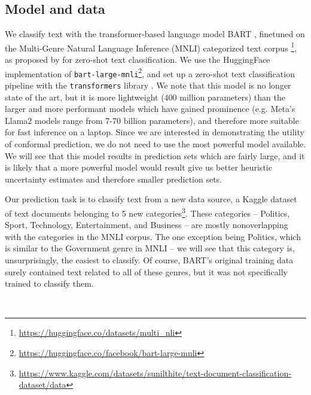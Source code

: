 \documentclass[a4paper, 12pt]{article}
\begin{document}
\subsection*{Model and data}
We classify text with the transformer-based language model BART \autocite{lewisBARTDenoisingSequencetoSequence2019},
finetuned on the Multi-Genre Natural Language Inference (MNLI) categorized text corpus \footnote{\url{https://huggingface.co/datasets/multi_nli}},
as proposed by \textcite{yinBenchmarkingZeroshotText2019} for zero-shot text classification. We use the HuggingFace implementation of \texttt{bart-large-mnli}\footnote{\url{https://huggingface.co/facebook/bart-large-mnli}}, and set up a zero-shot text classification pipeline with the \texttt{transformers} library \autocite{wolfHuggingFaceTransformersStateoftheart2019}.
We note that this model is no longer state of the art, but it is more lightweight (400 million parameters) than the larger and more performant models which have gained prominence (e.g. Meta's Llama2 models range from 7-70 billion parameters), and therefore more suitable for fast inference on a laptop.
Since we are interested in demonstrating the utility of conformal prediction, we do not need to use the most powerful model available.
We will see that this model results in prediction sets which are fairly large, and it is likely that a more powerful model would result give us better heuristic uncertainty estimates and therefore smaller prediction sets.


Our prediction task is to classify text from a new data source, a Kaggle dataset of text documents belonging to 5 new categories\footnote{\url{https://www.kaggle.com/datasets/sunilthite/text-document-classification-dataset/data}}. These categories -- Politics, Sport, Technology, Entertainment, and Business -- are mostly nonoverlapping with the categories in the MNLI corpus. The one exception being Politics, which is similar to the Government genre in MNLI -- we will see that this category is, unsurprisingly, the easiest to classify. Of course, BART's original training data surely contained text related to all of these genres, but it was not specifically trained to classify them.

\
\end{document}
